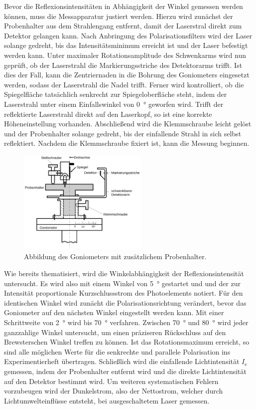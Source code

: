 Bevor die Reflexionsintensitäten in Abhängigkeit der Winkel gemessen werden können, muss die Messapparatur justiert werden. Hierzu wird zunächst der Probenhalter aus dem 
Strahlengang entfernt, damit der Laserstral direkt zum Detektor gelangen kann. Nach Anbringung des Polarisationsfilters wird der Laser solange gedreht, bis das 
Intensitätsminimum erreicht ist und der Laser befestigt werden kann. Unter maximaler Rotationsamplitude des Schwenkarms wird nun geprüft, ob der Laserstrahl die 
Markierungsstriche des Detektorarms trifft. Ist dies der Fall, kann die Zentriernaden in die Bohrung des Goniometers eingesetzt werden, sodass der Laserstrahl die 
Nadel trifft. Ferner wird kontrolliert, ob die Spiegelfläche tatsächlich senkrecht zur Spiegeloberfläche steht, indem der Laserstrahl unter einem Einfallswinkel von 
\qty{0}{\degree} geworfen wird. Trifft der reflektierte Laserstrahl direkt auf den Laserkopf, so ist eine korrekte Höheneinstellung vorhanden. Abschließend wird die 
Klemmschraube leicht gelöst und der Probenhalter solange gedreht, bis der einfallende Strahl in sich selbst reflektiert. Nachdem die Klemmschraube fixiert ist, kann die 
Messung beginnen.

\begin{figure}
    \centering 
    \includegraphics[height=5cm]{Goniometer.png}
    \caption{Abbildung des Goniometers mit zusätzlichem Probenhalter\cite{Versuchsanleitung_v407}.}
    \label{fig:Goniometer}
\end{figure}

\noindent Wie bereits thematisiert, wird die Winkelabhängigkeit der Reflexionsintensität untersucht. Es wird also mit einem Winkel von \qty{5}{\degree} gestartet und
und der zur Intensität proportionale Kurzschlussstrom des Photoelements notiert. Für den identischen Winkel wird zunächt die Polarisationsrichtung verändert, bevor das 
Goniometer auf den nächsten Winkel eingestellt werden kann. Mit einer Schrittweite von \qty{2}{\degree} wird bis \qty{70}{\degree} verfahren. Zwischen \qty{70}{\degree}
und \qty{80}{\degree} wird jeder ganzzahlige Winkel untersucht, um einen präziseren Rückschluss auf den Brewsterschen Winkel treffen zu können. Ist das Rotationsmaximum 
erreicht, so sind alle möglichen Werte für die senkrechte und parallele Polarisation ins Experimentierheft übertragen. Schließlich wird die einfallende Lichtintensität 
$I_\text{e}$ gemessen, indem der Probenhalter entfernt wird und die direkte Lichtintensität auf den Detektor bestimmt wird. Um weiteren systematischen Fehlern vorzubeugen
wird der Dunkelstrom, also der Nettostrom, welcher durch Lichtumwelteinflüsse entsteht, bei ausgeschaltetem Laser gemessen.


